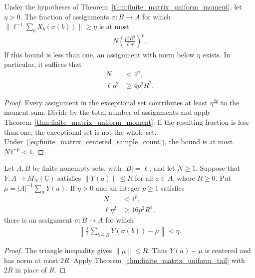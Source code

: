 \begin{theorem}
    \label{thm:finite_matrix_uniform_tail}
    \leanok
    Under the hypotheses of Theorem~\ref{thm:finite_matrix_uniform_moment},
    let $\eta>0$. The fraction of assignments $\sigma:B\to A$ for which
    $\|\ell^{-1}\sum_bX_b(\sigma(b))\|\ge\eta$ is at most
    \begin{align}
        N\left(\frac{p^2R^2}{\ell\eta^2}\right)^p.
        \label{eq:finite_matrix_uniform_tail}
    \end{align}
    If this bound is less than one, an assignment with norm below $\eta$
    exists. In particular, it suffices that
    \begin{align}
        N          & <4^p,       \\
        \ell\eta^2 & \ge4p^2R^2.
        \label{eq:finite_matrix_centered_sample_count}
    \end{align}
\end{theorem}
\begin{proof}\leanok
    Every assignment in the exceptional set contributes at least $\eta^{2p}$
    to the moment sum. Divide by the total number of assignments and
    apply Theorem~\ref{thm:finite_matrix_uniform_moment}. If the resulting
    fraction is less than one, the exceptional set is not the whole set.
    Under~(\ref{eq:finite_matrix_centered_sample_count}), the bound is
    at most $N4^{-p}<1$.
\end{proof}

\begin{theorem}
    \label{thm:finite_matrix_sample_mean}
    \leanok
    Let $A,B$ be finite nonempty sets, with $|B|=\ell$, and let $N\ge1$.
    Suppose that $Y:A\to M_N(\mathbb C)$ satisfies $\|Y(a)\|\le R$ for all
    $a\in A$, where $R\ge0$. Put $\mu=|A|^{-1}\sum_aY(a)$.
    If $\eta>0$ and an integer $p\ge1$ satisfies
    \begin{align}
        N          & <4^p,        \\
        \ell\eta^2 & \ge16p^2R^2,
        \label{eq:finite_matrix_sample_count}
    \end{align}
    there is an assignment $\sigma:B\to A$ for which
    \begin{align}
        \left\|\frac1\ell\sum_{b\in B}Y(\sigma(b))-\mu\right\|<\eta.
        \label{eq:finite_matrix_sample_mean}
    \end{align}
\end{theorem}
\begin{proof}\leanok
    The triangle inequality gives $\|\mu\|\le R$. Thus $Y(a)-\mu$ is
    centered and has norm at most $2R$. Apply
    Theorem~\ref{thm:finite_matrix_uniform_tail} with $2R$ in place of $R$.
\end{proof}

